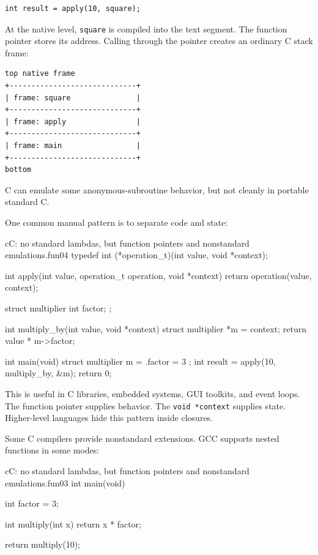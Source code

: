 \documentclass[a4paper,twoside]{report}
\begin{document}
\begin{verbatim}
int result = apply(10, square);
\end{verbatim}

At the native level, \texttt{square} is compiled into the text segment. The function pointer stores its address. Calling through the pointer creates an ordinary C stack frame:

\begin{verbatim}
top native frame
+-----------------------------+
| frame: square               |
+-----------------------------+
| frame: apply                |
+-----------------------------+
| frame: main                 |
+-----------------------------+
bottom
\end{verbatim}

C can emulate some anonymous-subroutine behavior, but not cleanly in portable standard C.

One common manual pattern is to separate code and state:

\begin{codebox}[]{c}{C: no standard lambdas, but function pointers and nonstandard emulations.}{fun04}
typedef int (*operation_t)(int value, void *context);

int apply(int value, operation_t operation, void *context) {
    return operation(value, context);
}

struct multiplier {
    int factor;
};

int multiply_by(int value, void *context) {
    struct multiplier *m = context;
    return value * m->factor;
}

int main(void) {
    struct multiplier m = { .factor = 3 };
    int result = apply(10, multiply_by, &m);
    return 0;
}
\end{codebox}


This is useful in C libraries, embedded systems, GUI toolkits, and event loops. The function pointer supplies behavior. The \texttt{void *context} supplies state. Higher-level languages hide this pattern inside closures.

Some C compilers provide nonstandard extensions. GCC supports nested functions in some modes:

\begin{codebox}[]{c}{C: no standard lambdas, but function pointers and nonstandard emulations.}{fun03}
int main(void) {
    int factor = 3;

    int multiply(int x) {
        return x * factor;
    }

    return multiply(10);
}
\end{codebox}
\end{document}
